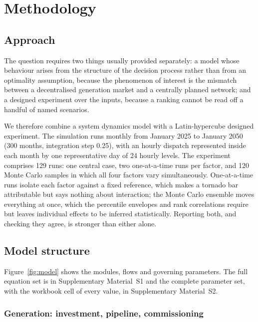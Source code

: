 \section{Methodology}
\label{sec:methodology}

\subsection{Approach}
\label{sec:method:approach}

The question requires two things usually provided separately: a model whose behaviour
arises from the structure of the decision process rather than from an optimality
assumption, because the phenomenon of interest is the mismatch between a decentralised
generation market and a centrally planned network; and a designed experiment over the
inputs, because a ranking cannot be read off a handful of named scenarios.

We therefore combine a system dynamics model with a Latin-hypercube designed
experiment. The simulation runs monthly from January 2025 to January 2050 (300 months,
integration step \SI{0.25}{\month}), with an hourly dispatch represented inside each
month by one representative day of 24 hourly levels. The experiment comprises 129 runs:
one central case, two one-at-a-time runs per factor, and 120 Monte Carlo samples in
which all four factors vary simultaneously. One-at-a-time runs isolate each factor
against a fixed reference, which makes a tornado bar attributable but says nothing
about interaction; the Monte Carlo ensemble moves everything at once, which the
percentile envelopes and rank correlations require but leaves individual effects to be
inferred statistically. Reporting both, and checking they agree, is stronger than
either alone.

\subsection{Model structure}
\label{sec:method:structure}

Figure~\ref{fig:model} shows the modules, flows and governing parameters. The full
equation set is in Supplementary Material~S1 and the complete parameter set, with the
workbook cell of every value, in Supplementary Material~S2.



\subsubsection{Generation: investment, pipeline, commissioning}
\label{sec:method:gen}


